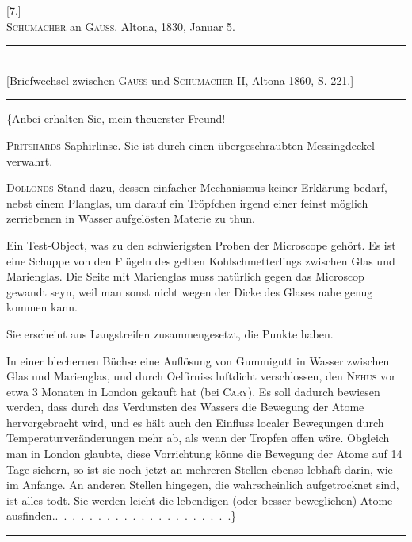 \clearpage\begingroup{}
\begin{center}
[7.]\\[.7em]
\textsc{Schumacher} an \textsc{Gauss}. Altona, 1830, Januar 5.
\par\smallskip\rule{.78\textwidth}{.35pt}\\
{\small [Briefwechsel zwischen \textsc{Gauss} und \textsc{Schumacher} II, Altona 1860, S. 221.]}\\
\rule{.78\textwidth}{.35pt}
\end{center}
\noindent\hspace*{\parindent}\{Anbei erhalten Sie, mein theuerster Freund!
\begin{list}{}{\setlength{\leftmargin}{1.8em}\setlength{\labelwidth}{1.3em}\setlength{\labelsep}{.5em}\setlength{\listparindent}{1.2em}\setlength{\itemsep}{.3em}\setlength{\topsep}{0pt}}
\item[1)] \textsc{Pritshards} Saphirlinse. Sie ist durch einen übergeschraubten Messingdeckel
verwahrt.
\item[2)] \textsc{Dollonds} Stand dazu, dessen einfacher Mechanismus keiner Erklärung
bedarf, nebst einem Planglas, um darauf ein Tröpfchen irgend einer feinst
möglich zerriebenen in Wasser aufgelösten Materie zu thun.
\item[3)] Ein Test-Object, was zu den schwierigsten Proben der Microscope gehört.
Es ist eine Schuppe von den Flügeln des gelben Kohlschmetterlings zwischen
Glas und Marienglas. Die Seite mit Marienglas muss natürlich
gegen das Microscop gewandt seyn, weil man sonst nicht wegen der Dicke
des Glases nahe genug kommen kann.

Sie erscheint \raisebox{-.6em}{} aus Langstreifen zusammengesetzt, die Punkte
haben.
\item[4)] In einer blechernen Büchse eine Auflösung von Gummigutt in Wasser
zwischen Glas und Marienglas, und durch Oelfirniss luftdicht verschlossen,
den \textsc{Nehus} vor etwa 3 Monaten in London gekauft hat (bei \textsc{Cary}). Es
soll dadurch bewiesen werden, dass durch das Verdunsten des Wassers die
Bewegung der Atome  hervorgebracht wird, und es hält auch den
Einfluss localer Bewegungen durch Temperaturveränderungen mehr ab, als
wenn der Tropfen offen wäre. Obgleich man in London glaubte, diese
Vorrichtung könne die Bewegung der Atome auf 14 Tage sichern, so ist
sie noch jetzt an mehreren Stellen ebenso lebhaft darin, wie im Anfange.
An anderen Stellen hingegen, die wahrscheinlich aufgetrocknet sind, ist
alles todt. Sie werden leicht die lebendigen (oder besser beweglichen)
Atome ausfinden.\quad \mbox{.\ .\ .\ .\ .\ .\ .\ .\ .\ .\ .\ .\ .\ .\ .\ .\ .\ .\ .\ .\ .\}}
\end{list}
\begin{center}\rule{.18\textwidth}{.35pt}\end{center}
\clearpage\endgroup
